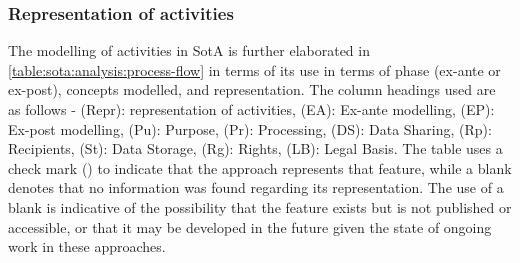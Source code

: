 \subsubsection{Representation of activities}\label{sota:analysis:process-flows}
The modelling of activities in SotA is further elaborated in \autoref{table:sota:analysis:process-flow} in terms of its use in terms of phase (ex-ante or ex-post), concepts modelled, and representation. The column headings used are as follows - (Repr): representation of activities, (EA): Ex-ante modelling, (EP): Ex-post modelling, (Pu): Purpose, (Pr): Processing, (DS): Data Sharing, (Rp): Recipients, (St): Data Storage, (Rg): Rights, (LB): Legal Basis.
The table uses a check mark (\cmark) to indicate that the approach represents that feature, while a blank denotes that no information was found regarding its representation. The use of a blank is indicative of the possibility that the feature exists but is not published or accessible, or that it may be developed in the future given the state of ongoing work in these approaches.
